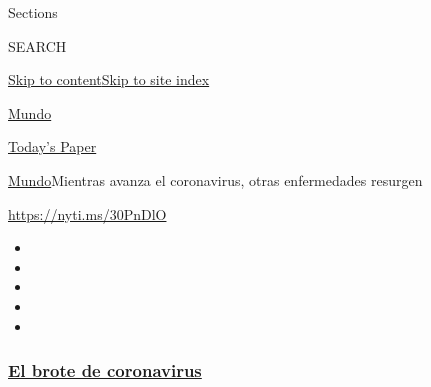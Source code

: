 Sections

SEARCH

\protect\hyperlink{site-content}{Skip to
content}\protect\hyperlink{site-index}{Skip to site index}

\href{https://www.nytimes3xbfgragh.onion/es/section/mundo}{Mundo}

\href{https://myaccount.nytimes3xbfgragh.onion/auth/login?response_type=cookie\&client_id=vi}{}

\href{https://www.nytimes3xbfgragh.onion/section/todayspaper}{Today's
Paper}

\href{/es/section/mundo}{Mundo}\textbar{}Mientras avanza el coronavirus,
otras enfermedades resurgen

\url{https://nyti.ms/30PnDlO}

\begin{itemize}
\item
\item
\item
\item
\item
\end{itemize}

\hypertarget{el-brote-de-coronavirus}{%
\subsubsection{\texorpdfstring{\href{https://www.nytimes3xbfgragh.onion/es/spotlight/coronavirus?name=styln-coronavirus-es\&region=TOP_BANNER\&variant=undefined\&block=storyline_menu_recirc\&action=click\&pgtype=Article\&impression_id=ebbe6bf0-e39c-11ea-8ef3-3565b30fff31}{El
brote de
coronavirus}}{El brote de coronavirus}}\label{el-brote-de-coronavirus}}

